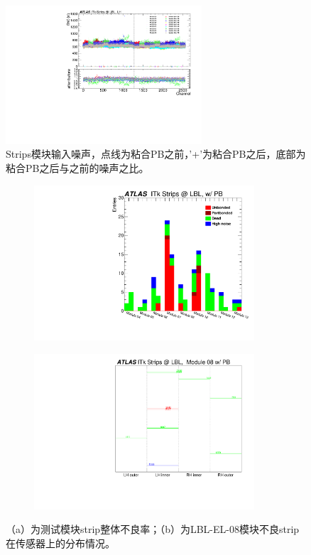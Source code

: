 \begin{figure}[h]
\centering
 \includegraphics[width=0.65\textwidth, angle=-90]{fig/LH_noise.pdf}
 \caption{Strips模块输入噪声，点线为粘合PB之前，'+'为粘合PB之后，底部为粘合PB之后与之前的噪声之比。}
 \label{fig:strips_testing_noise}
\end{figure}
\begin{figure}[h]
\centering
\begin{subfigure}[b]{0.45\textwidth}
\centering
 \includegraphics[width=0.9\textwidth,angle=-90]{fig/Hists_Bad_wPB.pdf}
 \caption{}
\end{subfigure}
\begin{subfigure}[b]{0.45\textwidth}
\centering
 \includegraphics[width=0.9\textwidth,angle=-90]{fig/BadDistr_LBL-EL-08_wPB.pdf}
 \caption{}
\end{subfigure}
\caption{（a）为测试模块strip整体不良率；（b）为LBL-EL-08模块不良strip在传感器上的分布情况。}
\label{fig:strips_bad_dist}
\end{figure}

